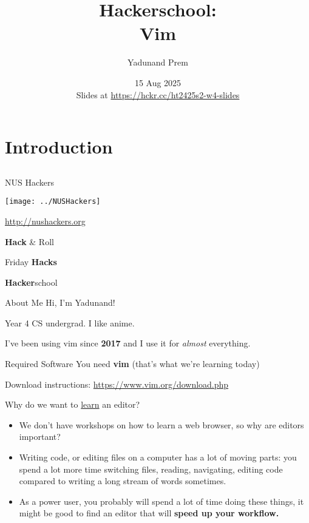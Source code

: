 \documentclass[12pt]{beamer}
\title{Hackerschool: \\Vim}
\author{Yadunand Prem}
\date{15 Aug 2025 \\ Slides at \url{https://hckr.cc/ht2425s2-w4-slides}}
\begin{document}
\frame[plain]{\titlepage}

\section{Introduction}
\subsection{}

\begin{frame}{NUS Hackers}

    \begin{center}
        \texttt{[image: ../NUSHackers]}

        \url{http://nushackers.org}
    \end{center}

    \begin{center}
        \textbf{Hack} \& Roll

        Friday \textbf{Hacks}

        \textbf{Hacker}school
    \end{center}

\end{frame}

\begin{frame}{About Me}
    Hi, I'm Yadunand!

    Year 4 CS undergrad. I like anime.

    I've been using vim since \textbf{2017} and I use it for \textit{almost} everything.
\end{frame}

\begin{frame}{Required Software}
    You need \textbf{vim} (that's what we're learning today)

    Download instructions: \url{https://www.vim.org/download.php}
\end{frame}

\begin{frame}{Why do we want to \underline{learn} an editor?}
    \begin{itemize}
        \item We don't have workshops on how to learn a web browser, so why are editors important?
        \item Writing code, or editing files on a computer has a lot of moving parts: you spend a lot more time switching files, reading, navigating, editing code compared to writing a long stream of words sometimes.
        \item As a power user, you probably will spend a lot of time doing these things, it might be good to find an editor that will \textbf{speed up your workflow.}
    \end{itemize}
\end{frame}
\end{document}
